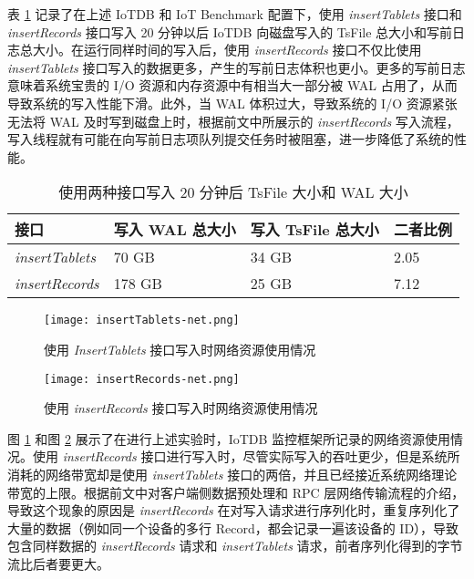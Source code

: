 表 \ref{tabular:wal-vs-tsfile-size} 记录了在上述 IoTDB 和 IoT Benchmark 配置下，使用 \emph{insertTablets} 接口和 \emph{insertRecords} 接口写入 20 分钟以后 IoTDB 向磁盘写入的 TsFile 总大小和写前日志总大小。在运行同样时间的写入后，使用 \emph{insertRecords} 接口不仅比使用 \emph{insertTablets} 接口写入的数据更多，产生的写前日志体积也更小。更多的写前日志意味着系统宝贵的 I/O 资源和内存资源中有相当大一部分被 WAL 占用了，从而导致系统的写入性能下滑。此外，当 WAL 体积过大，导致系统的 I/O 资源紧张无法将 WAL 及时写到磁盘上时，根据前文中所展示的 \emph{insertRecords} 写入流程，写入线程就有可能在向写前日志项队列提交任务时被阻塞，进一步降低了系统的性能。


\begin{table}
  \caption{使用两种接口写入 20 分钟后 TsFile 大小和 WAL 大小}
  \centering
  \begin{tabular}{llll}
  \toprule 
  接口 & 写入 WAL 总大小 & 写入 TsFile 总大小 & 二者比例 \\
  \midrule 
  \emph{insertTablets} &  70 GB & 34 GB &  2.05 \\
  \emph{insertRecords} & 178 GB & 25 GB & 7.12 \\
  \bottomrule
  \end{tabular}
  \label{tabular:wal-vs-tsfile-size}
\end{table}


\begin{figure}
  \centering
  \texttt{[image: insertTablets-net.png]}
  \caption{使用 \emph{InsertTablets} 接口写入时网络资源使用情况}
  \label{fig:curr-insert-tablets-net}
\end{figure}

\begin{figure}
  \centering
  \texttt{[image: insertRecords-net.png]}
  \caption{使用 \emph{insertRecords} 接口写入时网络资源使用情况}
  \label{fig:curr-insert-records-net}
\end{figure}



图 \ref{fig:curr-insert-tablets-net} 和图 \ref{fig:curr-insert-records-net} 展示了在进行上述实验时，IoTDB 监控框架所记录的网络资源使用情况。使用 \emph{insertRecords} 接口进行写入时，尽管实际写入的吞吐更少，但是系统所消耗的网络带宽却是使用 \emph{insertTablets} 接口的两倍，并且已经接近系统网络理论带宽的上限。根据前文中对客户端侧数据预处理和 RPC 层网络传输流程的介绍，导致这个现象的原因是 \emph{insertRecords} 在对写入请求进行序列化时，重复序列化了大量的数据（例如同一个设备的多行 Record，都会记录一遍该设备的 ID），导致包含同样数据的 \emph{insertRecords} 请求和 \emph{insertTablets} 请求，前者序列化得到的字节流比后者要更大。

